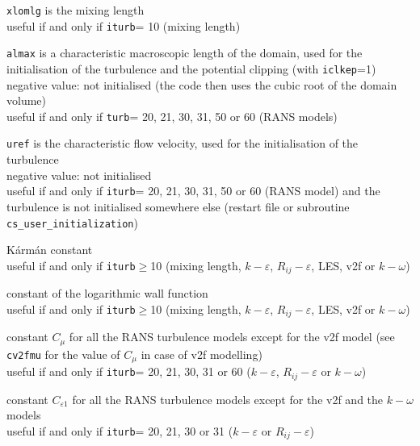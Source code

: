 {{\tt xlomlg} is the mixing length\\
useful if and only if {\tt iturb}= 10 (mixing length)}

{{\tt almax} is a characteristic macroscopic
length of the domain, used for the initialisation of the turbulence and
the potential clipping (with {\tt iclkep}=1)\\
negative value: not initialised (the code then uses the cubic root of
the domain volume)\\
useful if and only if {\tt turb}= 20, 21, 30, 31, 50 or 60 (RANS models)}

{{\tt uref} is the characteristic flow velocity,
used for the initialisation of the turbulence\\
negative value: not initialised\\
useful if and only if {\tt iturb}= 20, 21, 30, 31, 50 or 60 (RANS model)
and the turbulence is not initialised somewhere
else (restart file or subroutine \texttt{cs\_user\_initialization})}



{K\'arm\'an constant\\
useful if and only if {\tt iturb}$\geqslant$10
(mixing length, $k-\varepsilon$, $R_{ij}-\varepsilon$, LES, v2f or $k-\omega$)}

{constant of the logarithmic wall function\\
useful if and only if {\tt iturb}$\geqslant$10
(mixing length, $k-\varepsilon$, $R_{ij}-\varepsilon$, LES, v2f or $k-\omega$)}

{constant $C_\mu$ for all the RANS turbulence models except for the v2f model
(see {\tt cv2fmu} for the value of $C_\mu$ in case of v2f modelling)\\
useful if and only if {\tt iturb}= 20,
21, 30, 31 or 60 ($k-\varepsilon$, $R_{ij}-\varepsilon$ or $k-\omega$)}

{constant $C_{\varepsilon 1}$ for all the RANS turbulence models except
for the v2f and the $k-\omega$ models\\
useful if and only if {\tt iturb}= 20,
21, 30 or 31 ($k-\varepsilon$ or $R_{ij}-\varepsilon$)}

